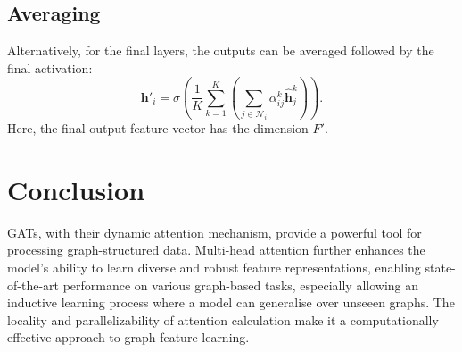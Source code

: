 \documentclass{article}
\begin{document}
	\subsection{Averaging}
	Alternatively, for the final layers, the outputs can be averaged followed by the final activation:
	\begin{equation}
		\mathbf{h}'_i = \sigma\left(\frac{1}{K} \sum_{k=1}^K \left( \sum_{j \in \mathcal{N}_i} \alpha_{ij}^k \mathbf{\hat{h}}_j^k \right) \right).
	\end{equation}
	Here, the final output feature vector has the dimension $F'$.
	
	
	\section{Conclusion}
	GATs, with their dynamic attention mechanism, provide a powerful tool for processing graph-structured data. Multi-head attention further enhances the model's ability to learn diverse and robust feature representations, enabling state-of-the-art performance on various graph-based tasks, especially allowing an inductive learning process where a model can generalise over unseeen graphs. The locality and parallelizability of attention calculation make it a computationally effective approach to graph feature learning.
	
\end{document}

